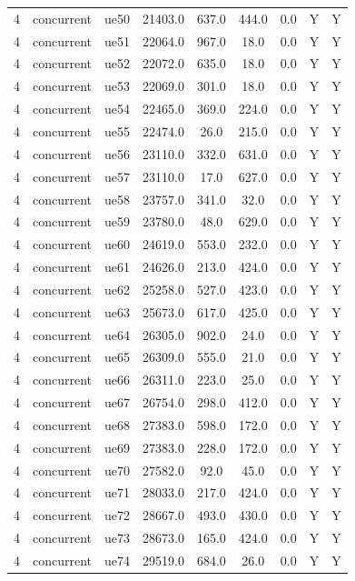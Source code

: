 \begin{table}[ht]
\begin{tabular}{|c|c|c|c|c|c|c|c|c|}
4 & concurrent & ue50 & 21403.0 & 637.0 & 444.0 & 0.0 & Y & Y \\
4 & concurrent & ue51 & 22064.0 & 967.0 & 18.0 & 0.0 & Y & Y \\
4 & concurrent & ue52 & 22072.0 & 635.0 & 18.0 & 0.0 & Y & Y \\
4 & concurrent & ue53 & 22069.0 & 301.0 & 18.0 & 0.0 & Y & Y \\
4 & concurrent & ue54 & 22465.0 & 369.0 & 224.0 & 0.0 & Y & Y \\
4 & concurrent & ue55 & 22474.0 & 26.0 & 215.0 & 0.0 & Y & Y \\
4 & concurrent & ue56 & 23110.0 & 332.0 & 631.0 & 0.0 & Y & Y \\
4 & concurrent & ue57 & 23110.0 & 17.0 & 627.0 & 0.0 & Y & Y \\
4 & concurrent & ue58 & 23757.0 & 341.0 & 32.0 & 0.0 & Y & Y \\
4 & concurrent & ue59 & 23780.0 & 48.0 & 629.0 & 0.0 & Y & Y \\
4 & concurrent & ue60 & 24619.0 & 553.0 & 232.0 & 0.0 & Y & Y \\
4 & concurrent & ue61 & 24626.0 & 213.0 & 424.0 & 0.0 & Y & Y \\
4 & concurrent & ue62 & 25258.0 & 527.0 & 423.0 & 0.0 & Y & Y \\
4 & concurrent & ue63 & 25673.0 & 617.0 & 425.0 & 0.0 & Y & Y \\
4 & concurrent & ue64 & 26305.0 & 902.0 & 24.0 & 0.0 & Y & Y \\
4 & concurrent & ue65 & 26309.0 & 555.0 & 21.0 & 0.0 & Y & Y \\
4 & concurrent & ue66 & 26311.0 & 223.0 & 25.0 & 0.0 & Y & Y \\
4 & concurrent & ue67 & 26754.0 & 298.0 & 412.0 & 0.0 & Y & Y \\
4 & concurrent & ue68 & 27383.0 & 598.0 & 172.0 & 0.0 & Y & Y \\
4 & concurrent & ue69 & 27383.0 & 228.0 & 172.0 & 0.0 & Y & Y \\
4 & concurrent & ue70 & 27582.0 & 92.0 & 45.0 & 0.0 & Y & Y \\
4 & concurrent & ue71 & 28033.0 & 217.0 & 424.0 & 0.0 & Y & Y \\
4 & concurrent & ue72 & 28667.0 & 493.0 & 430.0 & 0.0 & Y & Y \\
4 & concurrent & ue73 & 28673.0 & 165.0 & 424.0 & 0.0 & Y & Y \\
4 & concurrent & ue74 & 29519.0 & 684.0 & 26.0 & 0.0 & Y & Y \\

\end{tabular}
\end{table}
